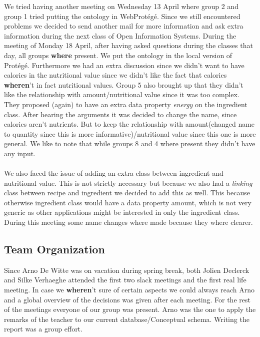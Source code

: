 \newline
\noindent
We tried having another meeting on Wednesday 13 April where group 2 and group 1 tried putting the ontology in WebProtégé. Since we still encountered problems we decided to send another mail for more information and ask extra information during the next class of Open Information Systems. 
\newline
\newline
\noindent
During the meeting of Monday 18 April, after having asked questions during the classes that day, all groups \textbf{where} present. We put the ontology in the local version of Protégé. Furthermore we had an extra discussion since we didn't want to have calories in the nutritional value since we didn't like the fact that calories \textbf{wheren}'t in fact nutritional values. Group 5 also brought up that they didn't like the relationship with amount/nutritional value since it was too complex. They proposed (again) to have an extra data property \emph{energy} on the ingredient class. After hearing the arguments it was decided to change the name, since calories aren't nutrients. But to keep the relationship with amount(changed name to quantity since this is more informative)/nutritional value since this one is more general. We like to note that while groups 8 and 4 where present they didn't have any input.\\ \\
We also faced the issue of adding an extra class between ingredient and nutritional value. This is not strictly necessary but because we also had a \emph{linking} class between recipe and ingredient we decided to add this as well. This because otherwise ingredient class would have a data property amount, which is not very generic as other applications might be interested in only the ingredient class. During this meeting some name changes where made because they where clearer.

\subsection{Team Organization}

Since Arno De Witte was on vacation during spring break, both Jolien Declerck and Silke Verhaeghe attended the first two slack meetings and the first real life meeting. In case we \textbf{wheren}'t sure of certain aspects we could always reach Arno and a global overview of the decisions was given after each meeting. For the rest of the meetings everyone of our group was present. Arno was the one to apply the remarks of the teacher to our current database/Conceptual schema. Writing the report was a group effort. 

